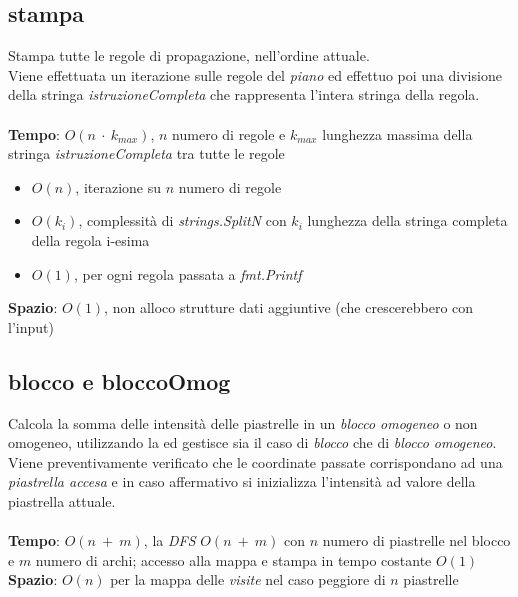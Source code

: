 \documentclass{article}
\begin{document}
\subsection{stampa}
Stampa tutte le regole di propagazione, nell'ordine attuale.\\
Viene effettuata un iterazione sulle regole del \textit{piano} ed effettuo poi una divisione della stringa \textit{istruzioneCompleta} che rappresenta l'intera stringa della regola.\\ \\
\textbf{Tempo}: \(O(n\ \cdot\ k_{max})\), \(n\) numero di regole e \(k_{max}\) lunghezza massima della stringa \textit{istruzioneCompleta} tra tutte le regole\\
\begin{itemize}
  \item \(O(n)\), iterazione su \(n\) numero di regole
  \item \(O(k_i)\), complessità di \textit{strings.SplitN} con \(k_i\) lunghezza della stringa completa della regola i-esima
  \item \(O(1)\), per ogni regola passata a \textit{fmt.Printf}
\end{itemize}
\textbf{Spazio}: \(O(1)\), non alloco strutture dati aggiuntive (che crescerebbero con l'input)

\subsection{blocco e bloccoOmog}\label{sec:block}
Calcola la somma delle intensità delle piastrelle in un \textit{blocco omogeneo} o non omogeneo, utilizzando la  ed gestisce sia il caso di \textit{blocco} che di \textit{blocco omogeneo}.\\
Viene preventivamente verificato che le coordinate passate corrispondano ad una \textit{piastrella accesa} e in caso affermativo si inizializza l'intensità ad valore della piastrella attuale.\\ \\
\textbf{Tempo}: \(O(n\ +\ m)\), la \textit{DFS} \(O(n\ +\ m)\) con \(n\) numero di piastrelle nel blocco e  \(m\) numero di archi; accesso alla mappa e stampa in tempo costante \(O(1)\)\\
\textbf{Spazio}: \(O(n)\) per la mappa delle \textit{visite} nel caso peggiore di \(n\) piastrelle
\end{document}

